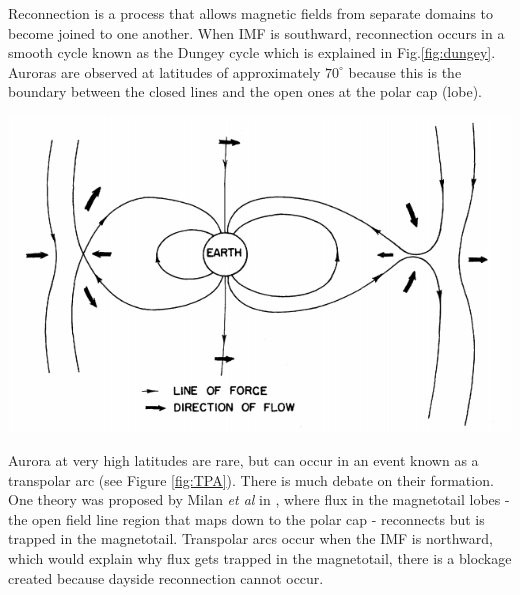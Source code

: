 \documentclass[12pt]{article}
\newenvironment{Figure}
  {\par\medskip\noindent\minipage{\linewidth}}
  {\endminipage\par\medskip}
\begin{document}
Reconnection is a process that allows magnetic fields from separate domains to become joined to one another. When IMF is southward, reconnection occurs in a smooth cycle known as the Dungey cycle \cite{dungeyCycle} which is explained in Fig.\ref{fig:dungey}. Auroras are observed at latitudes of approximately $70^{\circ}$ because this is the boundary between the closed lines and the open ones at the polar cap (lobe).


\begin{Figure}
    \centering
    \includegraphics[width=0.6\linewidth]{dungeyCycle.png}
    \label{fig:dungey}
\end{Figure}

Aurora at very high latitudes are rare, but can occur in an event known as a transpolar arc \cite{polarAurora1, polarAurora2} (see Figure \ref{fig:TPA}). There is much debate on their formation. One theory was proposed by Milan \textit{et al} in \cite{TPAdebate}, where flux in the magnetotail lobes - the open field line region that maps down to the polar cap - reconnects but is trapped in the magnetotail. Transpolar arcs occur when the IMF is northward, which would explain why flux gets trapped in the magnetotail, there is a blockage created because dayside reconnection cannot occur.
\end{document}
